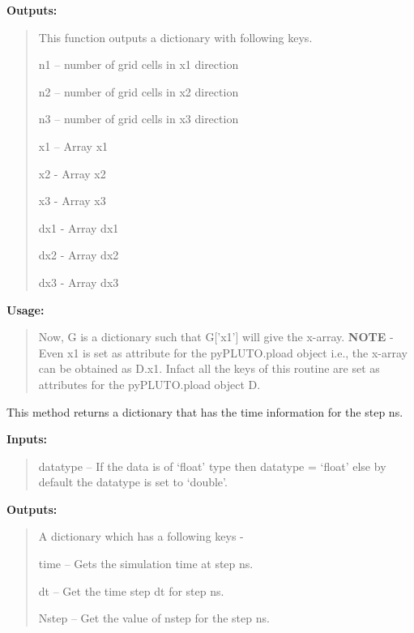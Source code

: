 \documentclass[letterpaper,10pt,english]{sphinxmanual}
\begin{document}
\begin{fulllineitems}
\begin{fulllineitems}
\textbf{Outputs:}
\begin{quote}

This function outputs a dictionary with following keys.

n1 -- number of grid cells in x1 direction

n2 -- number of grid cells in x2 direction

n3 -- number of grid cells in x3 direction

x1 -- Array x1

x2 - Array x2

x3 - Array x3

dx1 - Array dx1

dx2 - Array dx2

dx3 - Array dx3
\end{quote}

\textbf{Usage:}
\begin{quote}




Now, G is a dictionary such that G{[}'x1'{]} will give the x-array. \textbf{NOTE} - Even x1 is set as attribute for the pyPLUTO.pload object i.e., the x-array can be obtained as D.x1. Infact all the keys of this routine are set as attributes for the pyPLUTO.pload object D.
\end{quote}

\end{fulllineitems}


\begin{fulllineitems}
\label{pload:pyPLUTO.pload.time_info}
This method returns a dictionary that has the time information for the
step ns.

\textbf{Inputs:}
\begin{quote}

datatype -- If the data is of `float' type then datatype = `float' else by default the datatype is set to `double'.
\end{quote}

\textbf{Outputs:}
\begin{quote}

A dictionary which has a following keys -

time -- Gets the simulation time at step ns.

dt -- Get the time step dt for step ns.

Nstep -- Get the value of nstep for the step ns.
\end{quote}

\end{fulllineitems}


\end{fulllineitems}
\end{document}
